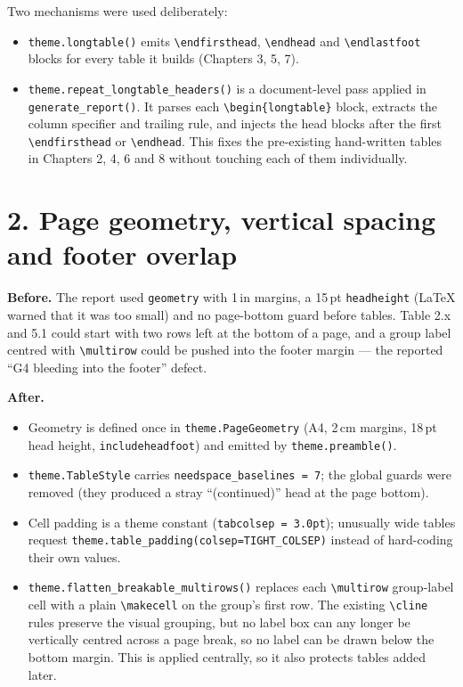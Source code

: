 \documentclass[11pt,a4paper]{article}
\newcommand{\code}[1]{\texttt{\small #1}}
\begin{document}
Two mechanisms were used deliberately:
\begin{itemize}
  \item \code{theme.longtable()} emits \code{\textbackslash endfirsthead},
        \code{\textbackslash endhead} and \code{\textbackslash endlastfoot} blocks
        for every table it builds (Chapters 3, 5, 7).
  \item \code{theme.repeat\_longtable\_headers()} is a document-level pass applied in
        \code{generate\_report()}. It parses each \code{\textbackslash begin\{longtable\}}
        block, extracts the column specifier and trailing rule, and injects the head
        blocks after the first \code{\textbackslash endfirsthead} or
        \code{\textbackslash endhead}. This fixes the pre-existing hand-written tables
        in Chapters 2, 4, 6 and 8 without touching each of them individually.
\end{itemize}

\section{2. Page geometry, vertical spacing and footer overlap}

\textbf{Before.} The report used \code{geometry} with 1\,in margins, a 15\,pt
\code{headheight} (LaTeX warned that it was too small) and no page-bottom guard
before tables. Table 2.x and 5.1 could start with two rows left at the bottom of a
page, and a group label centred with \code{\textbackslash multirow} could be pushed
into the footer margin --- the reported ``G4 bleeding into the footer'' defect.

\textbf{After.}
\begin{itemize}
  \item Geometry is defined once in \code{theme.PageGeometry} (A4, 2\,cm margins,
        18\,pt head height, \code{includeheadfoot}) and emitted by
        \code{theme.preamble()}.
  \item \code{theme.TableStyle} carries \code{needspace\_baselines = 7}; the global guards
        were removed (they produced a stray ``(continued)'' head at the page bottom).
  \item Cell padding is a theme constant (\code{tabcolsep = 3.0pt}); unusually wide
        tables request \code{theme.table\_padding(colsep=TIGHT\_COLSEP)} instead of
        hard-coding their own values.
  \item \code{theme.flatten\_breakable\_multirows()} replaces each
        \code{\textbackslash multirow} group-label cell with a plain
        \code{\textbackslash makecell} on the group's first row. The
        existing \code{\textbackslash cline} rules preserve the visual grouping, but
        no label box can any longer be vertically centred across a page break, so no
        label can be drawn below the bottom margin. This is applied centrally, so it
        also protects tables added later.
\end{itemize}
\end{document}
